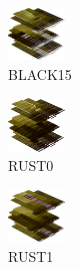 \hspace{0.1cm}
\begin{minipage}[b]{0.15\linewidth}
\begin{figure}[H]                                                          
  \centering                                                             
  \begin{adjustbox}{width=1.5cm,center}                                   
  \includegraphics[width=1.5cm]{src/colorspace_colourflow/flows/colourflow_15-45.png}%
  \end{adjustbox}                                                        
\caption*{BLACK15}                                           
\end{figure}                                                               
\end{minipage}
\hspace{0.1cm}
\begin{minipage}[b]{0.15\linewidth}
\begin{figure}[H]                                                          
  \centering                                                             
  \begin{adjustbox}{width=1.5cm,center}                                   
  \includegraphics[width=1.5cm]{src/colorspace_colourflow/flows/colourflow_16-45.png}%
  \end{adjustbox}                                                        
\caption*{RUST0}                                           
\end{figure}                                                               
\end{minipage}
\hspace{0.1cm}
\begin{minipage}[b]{0.15\linewidth}
\begin{figure}[H]                                                          
  \centering                                                             
  \begin{adjustbox}{width=1.5cm,center}                                   
  \includegraphics[width=1.5cm]{src/colorspace_colourflow/flows/colourflow_17-45.png}%
  \end{adjustbox}                                                        
\caption*{RUST1}                                           
\end{figure}                                                               
\end{minipage}
